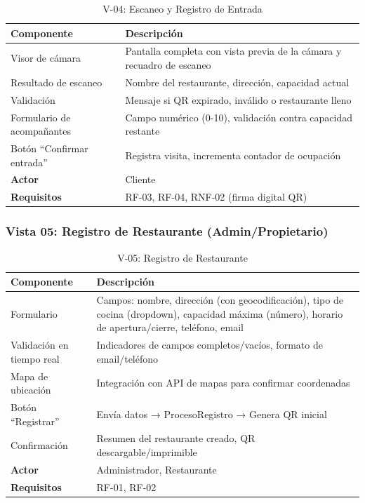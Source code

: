 \begin{table}[H]
    \centering
    \caption{V-04: Escaneo y Registro de Entrada}
    \label{tab:vista04}
    \begin{tabular}{|>{\raggedright\arraybackslash}p{}|>{\raggedright\arraybackslash}p{}|}
        \hline
        \textbf{Componente} & \textbf{Descripción} \\
        \hline
        Visor de cámara & Pantalla completa con vista previa de la cámara y recuadro de escaneo \\
        \hline
        Resultado de escaneo & Nombre del restaurante, dirección, capacidad actual \\
        \hline
        Validación & Mensaje si QR expirado, inválido o restaurante lleno \\
        \hline
        Formulario de acompañantes & Campo numérico (0-10), validación contra capacidad restante \\
        \hline
        Botón ``Confirmar entrada'' & Registra visita, incrementa contador de ocupación \\
        \hline
        \textbf{Actor} & Cliente \\
        \hline
        \textbf{Requisitos} & RF-03, RF-04, RNF-02 (firma digital QR) \\
        \hline
    \end{tabular}
\end{table}

\subsubsection{Vista 05: Registro de Restaurante (Admin/Propietario)}

\begin{table}[H]
    \centering
    \caption{V-05: Registro de Restaurante}
    \label{tab:vista05}
    \begin{tabular}{|>{\raggedright\arraybackslash}p{}|>{\raggedright\arraybackslash}p{}|}
        \hline
        \textbf{Componente} & \textbf{Descripción} \\
        \hline
        Formulario & Campos: nombre, dirección (con geocodificación), tipo de cocina (dropdown), capacidad máxima (número), horario de apertura/cierre, teléfono, email \\
        \hline
        Validación en tiempo real & Indicadores de campos completos/vacíos, formato de email/teléfono \\
        \hline
        Mapa de ubicación & Integración con API de mapas para confirmar coordenadas \\
        \hline
        Botón ``Registrar'' & Envía datos → ProcesoRegistro → Genera QR inicial \\
        \hline
        Confirmación & Resumen del restaurante creado, QR descargable/imprimible \\
        \hline
        \textbf{Actor} & Administrador, Restaurante \\
        \hline
        \textbf{Requisitos} & RF-01, RF-02 \\
        \hline
    \end{tabular}
\end{table}

